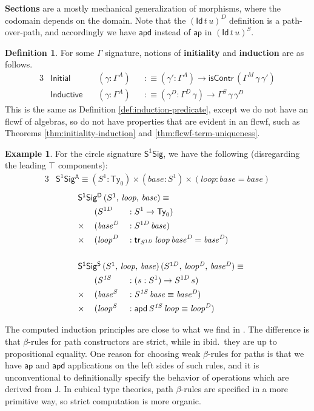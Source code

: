 \documentclass[12pt,a4paper,twoside,openany]{book}
\theoremstyle{remark}
\theoremstyle{definition}
\newtheorem{mydefinition}{Definition}
\newtheorem{myexample}{Example}
\theoremstyle{theorem}
\newcommand{\mi}[1]{\mathit{#1}}
\newcommand{\ms}[1]{\mathsf{#1}}
\newcommand{\ap}{\ms{ap}}
\newcommand{\apd}{\ms{apd}}
\newcommand{\tr}{\ms{tr}}
\newcommand{\J}{\ms{J}}
\newcommand{\Ty}{\mathsf{Ty}}
\newcommand{\Id}{\mathsf{Id}}
\newcommand{\defn}{:\equiv}
\begin{document}
\textbf{Sections} are a mostly mechanical generalization of morphisms, where the
codomain depends on the domain. Note that the $(\Id\,t\,u)^D$ definition is a
path-over-path, and accordingly we have $\apd$ instead of $\ap$ in $(\Id\,t\,u)^S$.

\begin{mydefinition} For some $\Gamma$ signature, notions of \textbf{initiality} and \textbf{induction} are
as follows.
\begin{alignat*}{3}
  &\ms{Initial}\,&&(\gamma : \Gamma^A) &&\defn (\gamma' : \Gamma^A) \to \ms{isContr}\,(\Gamma^M\,\gamma\,\gamma')\\
  &\ms{Inductive}\,&&(\gamma : \Gamma^A) &&\defn (\gamma^D : \Gamma^D\,\gamma) \to \Gamma^S\,\gamma\,\gamma^D
\end{alignat*}
This is the same as Definition \ref{def:induction-predicate}, except we do not have an
flcwf of algebras, so do not have properties that are evident in an flcwf, such
as Theorems \ref{thm:initiality-induction} and \ref{thm:flcwf-term-uniqueness}.
\end{mydefinition}

\begin{myexample}
For the circle signature $\ms{S^1Sig}$, we have the following (disregarding
the leading $\top$ components):
\begin{alignat*}{3}
  &\ms{S^1Sig^A} \equiv (S^1 : \Ty_0)
  \times (\mi{base} : S^1) \times (\mi{loop} : \mi{base} = \mi{base})
\end{alignat*}
\begin{alignat*}{3}
  &\rlap{$\ms{S^1Sig^D}\,(S^1,\,\mi{loop},\,\mi{base}) \equiv$}\\
  &        &&(S^{1D}        &&: S^1 \to \Ty_0)\\
  & \times\,&&(\mi{base^D} &&: S^{1D}\,\mi{base})\\
  & \times\,&&(\mi{loop^D} &&: \tr_{S^{1D}}\,\mi{loop}\,\mi{base^D} = \mi{base^D})\\
  & &&\\
  &\rlap{$\ms{S^1Sig^S}\,(S^1,\,\mi{loop},\,\mi{base})\,(S^{1D},\,\mi{loop^D},\,\mi{base^D}) \equiv$}\\
  &         &&(\mi{S^{1S}}  &&: (s : S^1) \to S^{1D}\,s)\\
  & \times\,&&(\mi{base^S} &&: \mi{S^{1S}}\,\mi{base} \equiv \mi{base^D})\\
  & \times\,&&(\mi{loop^S} &&: \apd\,\mi{S^{1S}}\,\mi{loop} \equiv \mi{loop^D})
\end{alignat*}
\end{myexample}
The computed induction principles are close to what we find in
\cite{hottbook}. The difference is that $\beta$-rules for path constructors are
strict, while in ibid.\ they are up to propositional equality. One reason for
choosing weak $\beta$-rules for paths is that we have $\ap$ and $\apd$ applications on the
left sides of such rules, and it is unconventional to definitionally specify the
behavior of operations which are derived from $\J$. In cubical type theories,
path $\beta$-rules are specified in a more primitive way, so strict computation is
more organic.
\end{document}
